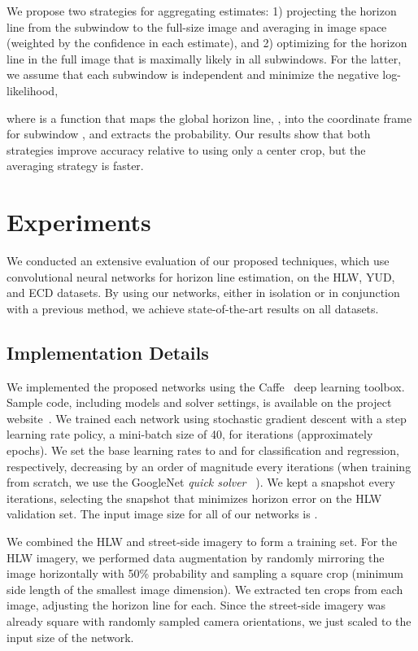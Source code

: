 \documentclass{bmvc2k}
\begin{document}
We propose two strategies for aggregating estimates: 1) projecting the
horizon line from the subwindow to the full-size image and averaging
in image space (weighted by the confidence in each estimate), and 2)
optimizing for the horizon line in the full image that is maximally
likely in all subwindows. For the latter, we assume that each
subwindow is independent and minimize the negative log-likelihood, 

where  is a function that maps the global horizon line, ,
into the coordinate frame for subwindow , and extracts the
probability.  Our results show that both strategies improve accuracy
relative to using only a center crop, but the averaging strategy is
faster. 




\section{Experiments}
\label{sec:bakeoff}

We conducted an extensive evaluation of our proposed techniques, which
use convolutional neural networks for horizon line estimation, on the
HLW, YUD, and ECD datasets. By using our networks, either in isolation
or in conjunction with a previous method, we achieve state-of-the-art
results on all datasets.



\subsection{Implementation Details}

We implemented the proposed networks using the Caffe~\cite{jia2014caffe}
deep learning toolbox. Sample code, including models and solver
settings, is available on the project website~\cite{hlwsite}.
We trained each network using stochastic gradient descent with
a step learning rate policy, a mini-batch size of 40, for 
iterations (approximately  epochs). We set the base learning rates
to  and  for classification and regression,
respectively, decreasing by an order of magnitude every 
iterations (when training from scratch, we use the GoogleNet {\em
quick solver} ~\cite{jia2014caffe}). We kept a snapshot every 
iterations, selecting the snapshot that minimizes horizon error on the
HLW validation set. The input image size for all of our networks is
. 

We combined the HLW and street-side imagery to form a training set. For
the HLW imagery, we performed data augmentation by randomly mirroring the image
horizontally with 50\% probability and sampling a square crop (minimum
side length  of the smallest image dimension). We extracted ten
crops from each image, adjusting the horizon line for each. Since the
street-side imagery was already square with randomly sampled camera
orientations, we just scaled to the input size of the network. 
\end{document}
